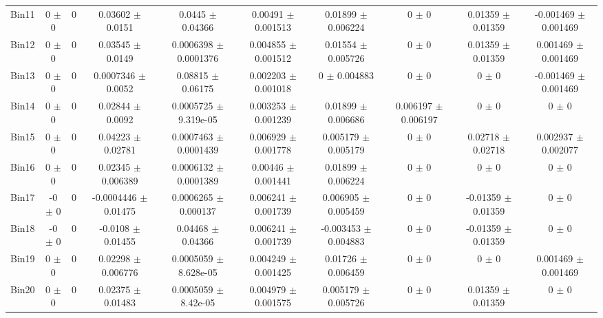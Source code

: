 \begin{tabular}{@{\extracolsep{4pt}}lccccccccc@{}}
     Bin11 & 0 $\pm$ 0 & 0 & 0.03602 $\pm$ 0.0151 & 0.0445 $\pm$ 0.04366 & 0.00491 $\pm$ 0.001513 & 0.01899 $\pm$ 0.006224 & 0 $\pm$ 0 & 0.01359 $\pm$ 0.01359 & -0.001469 $\pm$ 0.001469 \\ 
     Bin12 & 0 $\pm$ 0 & 0 & 0.03545 $\pm$ 0.0149 & 0.0006398 $\pm$ 0.0001376 & 0.004855 $\pm$ 0.001512 & 0.01554 $\pm$ 0.005726 & 0 $\pm$ 0 & 0.01359 $\pm$ 0.01359 & 0.001469 $\pm$ 0.001469 \\ 
     Bin13 & 0 $\pm$ 0 & 0 & 0.0007346 $\pm$ 0.0052 & 0.08815 $\pm$ 0.06175 & 0.002203 $\pm$ 0.001018 & 0 $\pm$ 0.004883 & 0 $\pm$ 0 & 0 $\pm$ 0 & -0.001469 $\pm$ 0.001469 \\ 
     Bin14 & 0 $\pm$ 0 & 0 & 0.02844 $\pm$ 0.0092 & 0.0005725 $\pm$ 9.319e-05 & 0.003253 $\pm$ 0.001239 & 0.01899 $\pm$ 0.006686 & 0.006197 $\pm$ 0.006197 & 0 $\pm$ 0 & 0 $\pm$ 0 \\ 
     Bin15 & 0 $\pm$ 0 & 0 & 0.04223 $\pm$ 0.02781 & 0.0007463 $\pm$ 0.0001439 & 0.006929 $\pm$ 0.001778 & 0.005179 $\pm$ 0.005179 & 0 $\pm$ 0 & 0.02718 $\pm$ 0.02718 & 0.002937 $\pm$ 0.002077 \\ 
     Bin16 & 0 $\pm$ 0 & 0 & 0.02345 $\pm$ 0.006389 & 0.0006132 $\pm$ 0.0001389 & 0.00446 $\pm$ 0.001441 & 0.01899 $\pm$ 0.006224 & 0 $\pm$ 0 & 0 $\pm$ 0 & 0 $\pm$ 0 \\ 
     Bin17 & -0 $\pm$ 0 & 0 & -0.0004446 $\pm$ 0.01475 & 0.0006265 $\pm$ 0.000137 & 0.006241 $\pm$ 0.001739 & 0.006905 $\pm$ 0.005459 & 0 $\pm$ 0 & -0.01359 $\pm$ 0.01359 & 0 $\pm$ 0 \\ 
     Bin18 & -0 $\pm$ 0 & 0 & -0.0108 $\pm$ 0.01455 & 0.04468 $\pm$ 0.04366 & 0.006241 $\pm$ 0.001739 & -0.003453 $\pm$ 0.004883 & 0 $\pm$ 0 & -0.01359 $\pm$ 0.01359 & 0 $\pm$ 0 \\ 
     Bin19 & 0 $\pm$ 0 & 0 & 0.02298 $\pm$ 0.006776 & 0.0005059 $\pm$ 8.628e-05 & 0.004249 $\pm$ 0.001425 & 0.01726 $\pm$ 0.006459 & 0 $\pm$ 0 & 0 $\pm$ 0 & 0.001469 $\pm$ 0.001469 \\ 
     Bin20 & 0 $\pm$ 0 & 0 & 0.02375 $\pm$ 0.01483 & 0.0005059 $\pm$ 8.42e-05 & 0.004979 $\pm$ 0.001575 & 0.005179 $\pm$ 0.005726 & 0 $\pm$ 0 & 0.01359 $\pm$ 0.01359 & 0 $\pm$ 0 \\ 
\hline\hline
  \end{tabular}
